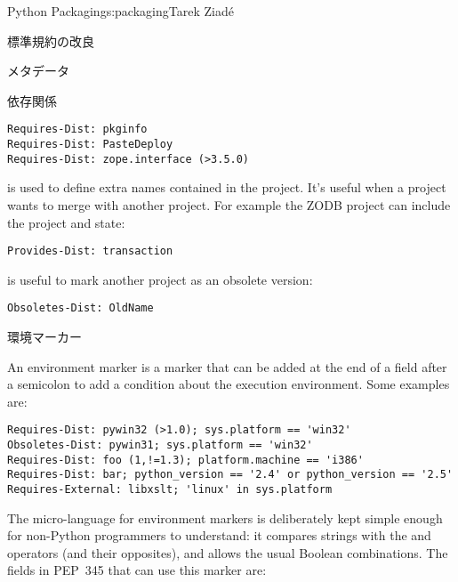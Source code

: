 \begin{aosachapter}{Python Packaging}{s:packaging}{Tarek Ziad\'{e}}
\begin{aosasect1}{標準規約の改良}
\begin{aosasect2}{メタデータ}
\begin{aosasect3}{依存関係}
\begin{verbatim}
Requires-Dist: pkginfo
Requires-Dist: PasteDeploy
Requires-Dist: zope.interface (>3.5.0)
\end{verbatim}

\noindent {} is used to define extra names contained in the
project.  It's useful when a project wants to merge with another
project. For example the ZODB project can include the
 project and state:

\begin{verbatim}
Provides-Dist: transaction
\end{verbatim}

\noindent {} is useful to mark another project as an obsolete
version:

\begin{verbatim}
Obsoletes-Dist: OldName
\end{verbatim}

\end{aosasect3}

\begin{aosasect3}{環境マーカー}

An environment marker is a marker that can be added at the end of a
field after a semicolon to add a condition about the execution
environment.  Some examples are:

\begin{verbatim}
Requires-Dist: pywin32 (>1.0); sys.platform == 'win32'
Obsoletes-Dist: pywin31; sys.platform == 'win32'
Requires-Dist: foo (1,!=1.3); platform.machine == 'i386'
Requires-Dist: bar; python_version == '2.4' or python_version == '2.5'
Requires-External: libxslt; 'linux' in sys.platform
\end{verbatim}

The micro-language for environment markers is deliberately kept simple
enough for non-Python programmers to understand: it compares strings
with the \code{==} and  operators (and their opposites), and
allows the usual Boolean combinations.  The fields in PEP~345 that can
use this marker are:

\begin{aosaitemize}
  \item {}
  \item {}
  \item {}
  \item {}
  \item {}
  \item {}
\end{aosaitemize}


\end{aosasect3}
\end{aosasect2}
\end{aosasect1}
\end{aosachapter}
